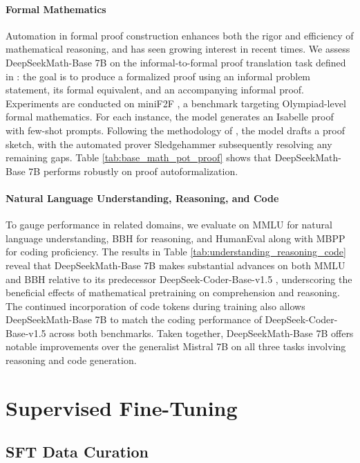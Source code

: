 \begin{itemize}[topsep=0pt]
\paragraph{Formal Mathematics}

Automation in formal proof construction enhances both the rigor and efficiency of mathematical reasoning, and has seen growing interest in recent times. We assess DeepSeekMath-Base 7B on the informal-to-formal proof translation task defined in \citep{dsp_proof}: the goal is to produce a formalized proof using an informal problem statement, its formal equivalent, and an accompanying informal proof. Experiments are conducted on miniF2F \citep{minif2f}, a benchmark targeting Olympiad-level formal mathematics. For each instance, the model generates an Isabelle proof with few-shot prompts. Following the methodology of \cite{dsp_proof}, the model drafts a proof sketch, with the automated prover Sledgehammer \citep{sledgehammer} subsequently resolving any remaining gaps. Table \ref{tab:base_math_pot_proof} shows that DeepSeekMath-Base 7B performs robustly on proof autoformalization.

\paragraph{Natural Language Understanding, Reasoning, and Code}

To gauge performance in related domains, we evaluate on MMLU \citep{mmlu} for natural language understanding, BBH \citep{bbh} for reasoning, and HumanEval \citep{codex} along with MBPP \citep{mbpp} for coding proficiency. The results in Table \ref{tab:understanding_reasoning_code} reveal that DeepSeekMath-Base 7B makes substantial advances on both MMLU and BBH relative to its predecessor DeepSeek-Coder-Base-v1.5 \citep{deepseek-coder}, underscoring the beneficial effects of mathematical pretraining on comprehension and reasoning. The continued incorporation of code tokens during training also allows DeepSeekMath-Base 7B to match the coding performance of DeepSeek-Coder-Base-v1.5 across both benchmarks. Taken together, DeepSeekMath-Base 7B offers notable improvements over the generalist Mistral 7B \citep{mistral} on all three tasks involving reasoning and code generation.

\section{Supervised Fine-Tuning}

\subsection{SFT Data Curation}


\end{itemize}
